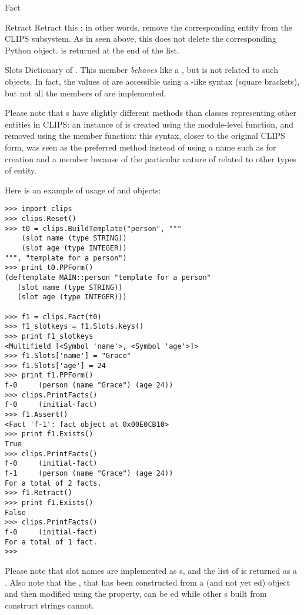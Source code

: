 \begin{classdesc*}{Fact}
\begin{methoddesc}{Retract}{}
Retract this : in other words, remove the corresponding
entity from the CLIPS subsystem. As in  seen above,
this does not delete the corresponding Python object.  is
returned at the end of the list.
\end{methoddesc}

\begin{memberdesc}[property]{Slots}
Dictionary of  . This member \emph{behaves} like
a , but is not related to such objects. In fact, the values
of  are accessible using a -like syntax (square
brackets), but not all the members of  are implemented.
\end{memberdesc}

Please note that s have slightly different methods than
classes representing other entities in CLIPS: an instance of 
is created using the module-level  function, and
removed using the  member function: this syntax,
closer to the original CLIPS form, was seen as the preferred method instead
of using a name such as  for creation and a
 member because of the particular nature of 
related to other types of entity.

Here is an example of usage of  and  objects:

\begin{verbatim}
>>> import clips
>>> clips.Reset()
>>> t0 = clips.BuildTemplate("person", """
    (slot name (type STRING))
    (slot age (type INTEGER))
""", "template for a person")
>>> print t0.PPForm()
(deftemplate MAIN::person "template for a person"
   (slot name (type STRING))
   (slot age (type INTEGER)))

>>> f1 = clips.Fact(t0)
>>> f1_slotkeys = f1.Slots.keys()
>>> print f1_slotkeys
<Multifield [<Symbol 'name'>, <Symbol 'age'>]>
>>> f1.Slots['name'] = "Grace"
>>> f1.Slots['age'] = 24
>>> print f1.PPForm()
f-0     (person (name "Grace") (age 24))
>>> clips.PrintFacts()
f-0     (initial-fact)
>>> f1.Assert()
<Fact 'f-1': fact object at 0x00E0CB10>
>>> print f1.Exists()
True
>>> clips.PrintFacts()
f-0     (initial-fact)
f-1     (person (name "Grace") (age 24))
For a total of 2 facts.
>>> f1.Retract()
>>> print f1.Exists()
False
>>> clips.PrintFacts()
f-0     (initial-fact)
For a total of 1 fact.
>>>
\end{verbatim}

Please note that slot names are implemented as s, and the
list of  is returned as a . Also note that
the  , that has been constructed from a
 (and not yet ed) object and then
modified using the  property, can be ed while
other s built from construct strings cannot.

\end{classdesc*}



